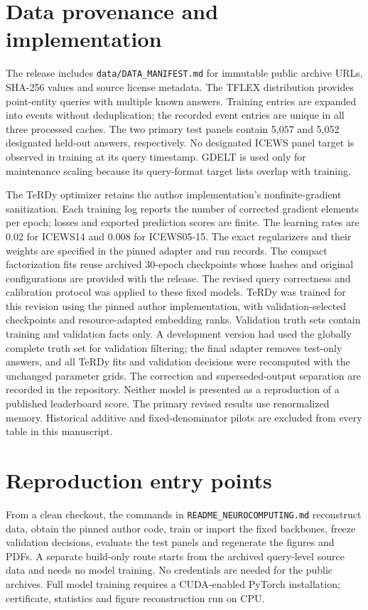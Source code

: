 \documentclass[11pt]{article}
\begin{document}
\section{Data provenance and implementation}
The release includes \texttt{data/DATA\_MANIFEST.md} for immutable public archive
URLs, SHA-256 values and source license metadata. The TFLEX distribution provides
point-entity queries with multiple known answers. Training entries are expanded
into events without deduplication; the recorded event entries are unique in all
three processed caches. The two primary test panels contain 5,057 and 5,052
designated held-out answers, respectively. No designated ICEWS panel target is
observed in training at its query timestamp. GDELT is used only for maintenance
scaling because its query-format target lists overlap with training.

The TeRDy optimizer retains the author implementation's nonfinite-gradient
sanitization. Each training log reports the number of corrected gradient
elements per epoch; losses and exported prediction scores are finite. The
learning rates are 0.02 for ICEWS14 and 0.008 for ICEWS05-15. The exact
regularizers and their weights are specified in the pinned adapter and run
records. The compact factorization fits reuse archived 30-epoch checkpoints whose
hashes and original configurations are provided with the release. The revised
query correctness and calibration protocol was applied to these fixed models.
TeRDy was trained for this revision using the pinned author implementation,
with validation-selected checkpoints and resource-adapted embedding ranks.
Validation truth sets contain training and validation facts only. A development
version had used the globally complete truth set for validation filtering;
the final adapter removes test-only answers, and all TeRDy fits and validation
decisions were recomputed with the unchanged parameter grids. The correction
and superseded-output separation are recorded in the repository.
Neither model is presented as a reproduction of a published leaderboard score.
The primary revised results use renormalized memory. Historical additive and
fixed-denominator pilots are excluded from every table in this manuscript.




\section{Reproduction entry points}
From a clean checkout, the commands in \texttt{README\_NEUROCOMPUTING.md}
reconstruct data, obtain the pinned author code, train or import the fixed
backbones, freeze validation decisions, evaluate the test panels and regenerate
the figures and PDFs. A separate build-only route starts from the archived
query-level source data and needs no model training. No credentials are needed
for the public archives. Full model training requires a CUDA-enabled PyTorch
installation; certificate, statistics and figure reconstruction run on CPU.
\end{document}

